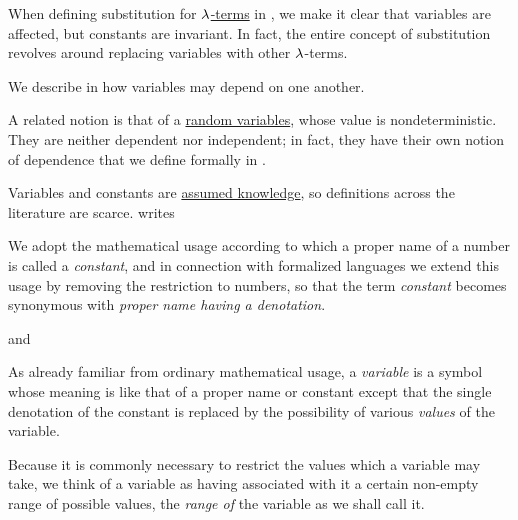 \begin{comments}
  \item When defining substitution for \hyperref[def:lambda_term]{\( {\mathrm \lambda} \)-terms} in , we make it clear that variables are affected, but constants are invariant. In fact, the entire concept of substitution revolves around replacing variables with other \( {\mathrm \lambda} \)-terms.

  \item We describe in  how variables may depend on one another.

  \item A related notion is that of a \hyperref[def:random_variable]{random variables}, whose value is nondeterministic. They are neither dependent nor independent; in fact, they have their own notion of dependence that we define formally in .

  \item Variables and constants are \hyperref[con:assumed_knowledge]{assumed knowledge}, so definitions across the literature are scarce.  writes
  \begin{displayquote}
    We adopt the mathematical usage according to which a proper name of a number is called a \textit{constant}, and in connection with formalized languages we extend this usage by removing the restriction to numbers, so that the term \textit{constant} becomes synonymous with \textit{proper name having a denotation}.
  \end{displayquote}
  and
  \begin{displayquote}
    As already familiar from ordinary mathematical usage, a \textit{variable} is a symbol whose meaning is like that of a proper name or constant except that the single denotation of the constant is replaced by the possibility of various \textit{values} of the variable.

    Because it is commonly necessary to restrict the values which a variable may take, we think of a variable as having associated with it a certain non-empty range of possible values, the \textit{range of} the variable as we shall call it.
  \end{displayquote}
\end{comments}


